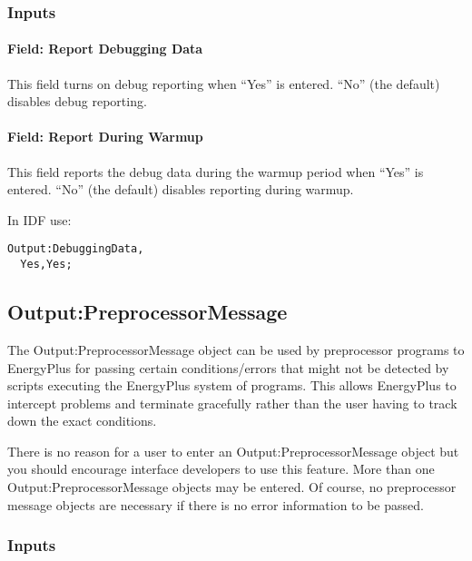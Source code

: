 \subsubsection{Inputs}\label{inputs-12-017}

\paragraph{Field: Report Debugging Data}\label{field-report-debugging-data}

This field turns on debug reporting when ``Yes'' is entered. ``No'' (the default) disables debug reporting.

\paragraph{Field: Report During Warmup}\label{field-report-during-warmup}

This field reports the debug data during the warmup period when ``Yes'' is entered. ``No'' (the default) disables reporting during warmup.

In IDF use:

\begin{lstlisting}
Output:DebuggingData,
  Yes,Yes;
\end{lstlisting}

\subsection{Output:PreprocessorMessage}\label{outputpreprocessormessage}

The Output:PreprocessorMessage object can be used by preprocessor programs to EnergyPlus for passing certain conditions/errors that might not be detected by scripts executing the EnergyPlus system of programs. This allows EnergyPlus to intercept problems and terminate gracefully rather than the user having to track down the exact conditions.

There is no reason for a user to enter an Output:PreprocessorMessage object but you should encourage interface developers to use this feature. More than one Output:PreprocessorMessage objects may be entered. Of course, no preprocessor message objects are necessary if there is no error information to be passed.

\subsubsection{Inputs}\label{inputs-13-014}

